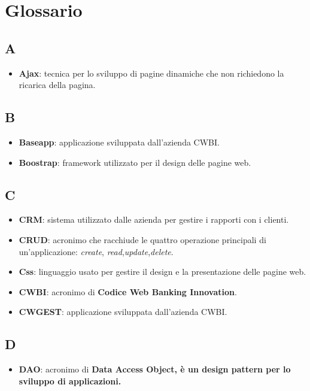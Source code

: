 
\chapter{Glossario}
\label{cap:glossario}

\section*{A}
\begin{itemize}
\item \textbf{Ajax}: tecnica per lo sviluppo di pagine dinamiche che non richiedono la ricarica della pagina.
\end{itemize}

\section*{B}
\begin{itemize}
\item \textbf{Baseapp}: applicazione sviluppata dall'azienda CWBI.
\item \textbf{Boostrap}: framework utilizzato per il design delle pagine web.
\end{itemize}

\section*{C}
\begin{itemize}
\item \textbf{CRM}: sistema utilizzato dalle azienda per gestire i rapporti con i clienti.
\item \textbf{CRUD}: acronimo che racchiude le quattro operazione principali di un'applicazione: \textit{create}, \textit{read},\textit{update},\textit{delete}.
\item \textbf{Css}: linguaggio usato per gestire il design e la presentazione delle pagine web.
\item \textbf{CWBI}: acronimo di \textbf{Codice Web Banking Innovation}.
\item \textbf{CWGEST}: applicazione sviluppata dall'azienda CWBI.
\end{itemize}

\section*{D}
\begin{itemize}
\item \textbf{DAO}: acronimo di \textbf{Data Access Object, è un design pattern per lo sviluppo di applicazioni.}
\end{itemize}

